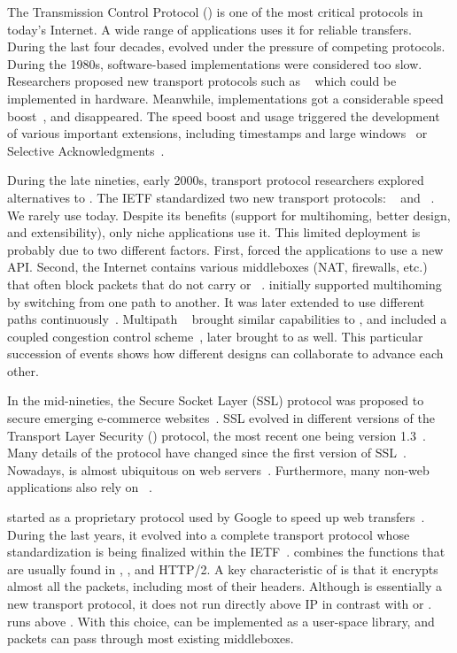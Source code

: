 The Transmission Control Protocol (\tcp) \cite{rfc793} is one of the most
critical protocols in today's Internet. A wide range of applications uses it for
reliable transfers. During the last four decades, \tcp evolved under the
pressure of competing protocols. During the 1980s, software-based \tcp
implementations were considered too slow. Researchers proposed new transport
protocols such as \xtp~\cite{sanders1990xpress} which could be implemented in
hardware. Meanwhile, \tcp implementations got a considerable speed
boost~\cite{clark1989analysis}, and \xtp disappeared. The \tcp speed boost and
usage triggered the development of various important \tcp extensions, including
timestamps and large windows~\cite{rfc1323} or Selective
Acknowledgments~\cite{rfc2018}.

During the late nineties, early 2000s, transport protocol researchers explored
alternatives to \tcp. The IETF standardized two new transport protocols:
\dccp~\cite{kohler2006designing} and \sctp~\cite{rfc4960}. We rarely use \dccp
today. Despite its benefits (support for multihoming, better design, and
extensibility), only niche applications use it. This limited deployment is
probably due to two different factors. First, \sctp forced the applications to
use a new API. Second, the Internet contains various middleboxes (NAT,
firewalls, etc.) that often block packets that do not carry \tcp or
\udp~\cite{honda2011still}.  \sctp initially supported multihoming by switching
from one path to another. It was later extended to use different
paths continuously~\cite{iyengar2006concurrent}.  Multipath
\tcp~\cite{rfc6824,raiciu2012hard} brought similar capabilities to \tcp, and
included a coupled congestion control scheme~\cite{wischik2011design}, later
brought to \sctp as well. This particular succession of events shows how
different designs can collaborate to advance each other.

In the mid-nineties, the Secure Socket Layer (SSL) protocol was proposed to
secure emerging e-commerce websites~\cite{draft-hickman-netscape-ssl}. SSL
evolved in different versions of the Transport Layer Security (\tls) protocol,
the most recent one being version 1.3~\cite{rfc8446}. Many details of the \tls
protocol have changed since the first version of SSL~\cite{kotzias2018coming}.
Nowadays, \tls is almost ubiquitous on web servers~\cite{holz2019era}.
Furthermore, many non-web applications also rely on \tls~\cite{anderson2019tls}.

\quic started as a proprietary protocol used by Google to speed up web
transfers~\cite{roskind2013quic,langley2017quic}. During the last years, it
evolved into a complete transport protocol whose standardization is being
finalized within the IETF~\cite{draft-ietf-quic-transport}. \quic combines the
functions that are usually found in \tcp, \tls, and HTTP/2. A key characteristic
of \quic is that it encrypts almost all the packets, including most of their
headers. Although \quic is essentially a new transport protocol, it does not run
directly above IP in contrast with \sctp or \tcp. \quic runs above \udp. With
this choice, \quic can be implemented as a user-space library, and \quic packets
can pass through most existing middleboxes.

